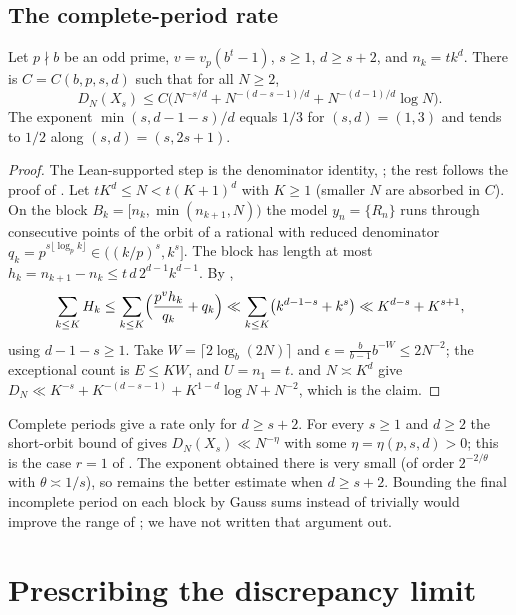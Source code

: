 \documentclass[11pt]{article}
\newcommand{\fr}[1]{\{#1\}}
\begin{document}
\subsection{The complete-period rate}

\begin{theorem}\label{thm:rate}
Let $p\nmid b$ be an odd prime, $v=v_p(b^t-1)$, $s\ge1$, $d\ge s+2$, and $n_k=tk^d$. There is
$C=C(b,p,s,d)$ such that for all $N\ge2$,
\[
D_N(X_s)\le C\bigl(N^{-s/d}+N^{-(d-s-1)/d}+N^{-(d-1)/d}\log N\bigr).
\]
The exponent $\min(s,d-1-s)/d$ equals $1/3$ for $(s,d)=(1,3)$ and tends to $1/2$ along
$(s,d)=(s,2s+1)$.
\end{theorem}

\begin{proof}
The Lean-supported step is the denominator identity, ; the rest follows the proof of
. Let $tK^d\le N<t(K+1)^d$ with $K\ge1$ (smaller $N$ are absorbed in $C$). On the
block $B_k=[n_k,\min(n_{k+1},N))$ the model $y_n=\fr{R_n}$ runs through consecutive points of
the orbit of a rational with reduced denominator $q_k=p^{s\lfloor\log_pk\rfloor}\in((k/p)^s,k^s]$.
The block has length at most $h_k=n_{k+1}-n_k\le t\,d\,2^{d-1}k^{d-1}$. By
,
\[
\sum_{k\le K}H_k\le\sum_{k\le K}\Bigl(\frac{p^vh_k}{q_k}+q_k\Bigr)
\ll\sum_{k\le K}\bigl(k^{d-1-s}+k^s\bigr)\ll K^{d-s}+K^{s+1},
\]
using $d-1-s\ge1$. Take $W=\lceil2\log_b(2N)\rceil$ and $\epsilon=\frac b{b-1}b^{-W}\le2N^{-2}$; the
exceptional count is $E\le KW$, and $U=n_1=t$.  and $N\asymp K^d$ give
$D_N\ll K^{-s}+K^{-(d-s-1)}+K^{1-d}\log N+N^{-2}$, which is the claim.
\end{proof}

\begin{remark}\label{rem:ratebeyond}
Complete periods give a rate only for $d\ge s+2$. For every $s\ge1$ and $d\ge2$ the short-orbit bound
of  gives $D_N(X_s)\ll N^{-\eta}$ with some $\eta=\eta(p,s,d)>0$; this is the case
$r=1$ of . The exponent obtained there is very small (of order $2^{-2/\theta}$ with
$\theta\asymp1/s$), so  remains the better estimate when $d\ge s+2$. Bounding the final
incomplete period on each block by Gauss sums instead of trivially would improve the range of
; we have not written that argument out.
\end{remark}

\section{Prescribing the discrepancy limit}\label{sec:program}
\end{document}
